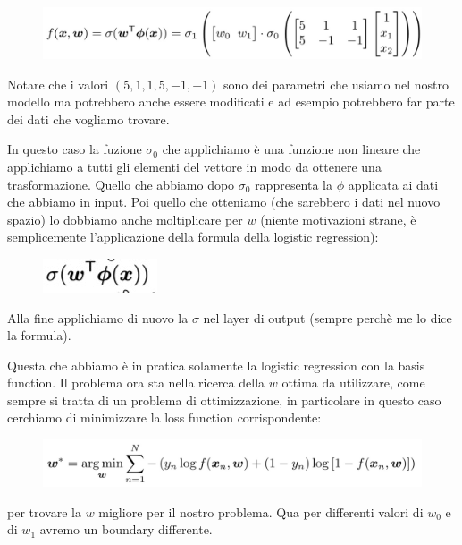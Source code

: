 \documentclass[14pt]{extreport}
\begin{document}
\begin{figure}[H]
\centering
\includegraphics[width=0.9\linewidth]{362.jpeg}
\end{figure}



Notare che i valori $(5,1,1,5,-1,-1)$ sono dei parametri che usiamo nel nostro modello ma potrebbero anche essere modificati e ad esempio potrebbero
far parte dei dati che vogliamo trovare.

In questo caso la fuzione $\sigma_0$ che applichiamo è una funzione non lineare che applichiamo a tutti gli elementi del vettore in modo da ottenere
una trasformazione. Quello che abbiamo dopo $\sigma_0$ rappresenta la $\phi$ applicata ai dati che abbiamo in input. Poi quello che otteniamo (che
sarebbero i dati nel nuovo spazio) lo dobbiamo anche moltiplicare per $w$ (niente motivazioni strane, è semplicemente l'applicazione della formula
della logistic regression):

\begin{figure}[H]
\centering
\includegraphics[width=0.3\linewidth]{364.jpeg}
\end{figure}

Alla fine applichiamo di nuovo la $\sigma$ nel layer di output (sempre perchè me lo dice la formula).

Questa che abbiamo è in pratica solamente la logistic regression con la basis function. Il problema ora sta nella ricerca della $w$ ottima da
utilizzare, come sempre si tratta di un problema di ottimizzazione, in particolare in questo caso cerchiamo di minimizzare la loss function
corrispondente:

\begin{figure}[H]
\centering
\includegraphics[width=0.7\linewidth]{363.jpeg}
\end{figure}

per trovare la $w$ migliore per il nostro problema. Qua per differenti valori di $w_0$ e di $w_1$ avremo un boundary differente.
\end{document}
